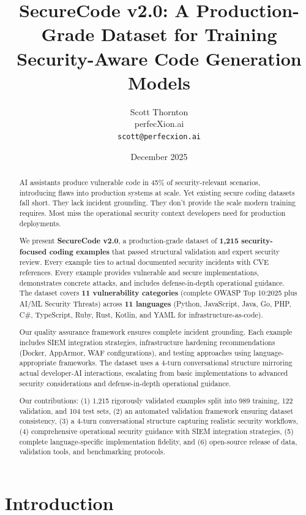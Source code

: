 \documentclass[11pt,letterpaper]{article}
\title{\textbf{SecureCode v2.0: A Production-Grade Dataset for Training Security-Aware Code Generation Models}}
\author{
    Scott Thornton \\
    perfecXion.ai \\
    \texttt{scott@perfecxion.ai}
}
\date{December 2025}
\begin{document}
\maketitle

\begin{abstract}
AI assistants produce vulnerable code in 45\% of security-relevant scenarios, introducing flaws into production systems at scale. Yet existing secure coding datasets fall short. They lack incident grounding. They don't provide the scale modern training requires. Most miss the operational security context developers need for production deployments.

We present \textbf{SecureCode v2.0}, a production-grade dataset of \textbf{1,215 security-focused coding examples} that passed structural validation and expert security review. Every example ties to actual documented security incidents with CVE references. Every example provides vulnerable and secure implementations, demonstrates concrete attacks, and includes defense-in-depth operational guidance. The dataset covers \textbf{11 vulnerability categories} (complete OWASP Top 10:2025 plus AI/ML Security Threats) across \textbf{11 languages} (Python, JavaScript, Java, Go, PHP, C\#, TypeScript, Ruby, Rust, Kotlin, and YAML for infrastructure-as-code).

Our quality assurance framework ensures complete incident grounding. Each example includes SIEM integration strategies, infrastructure hardening recommendations (Docker, AppArmor, WAF configurations), and testing approaches using language-appropriate frameworks. The dataset uses a 4-turn conversational structure mirroring actual developer-AI interactions, escalating from basic implementations to advanced security considerations and defense-in-depth operational guidance.

Our contributions: (1) 1,215 rigorously validated examples split into 989 training, 122 validation, and 104 test sets, (2) an automated validation framework ensuring dataset consistency, (3) a 4-turn conversational structure capturing realistic security workflows, (4) comprehensive operational security guidance with SIEM integration strategies, (5) complete language-specific implementation fidelity, and (6) open-source release of data, validation tools, and benchmarking protocols.
\end{abstract}

\section{Introduction}
\end{document}
